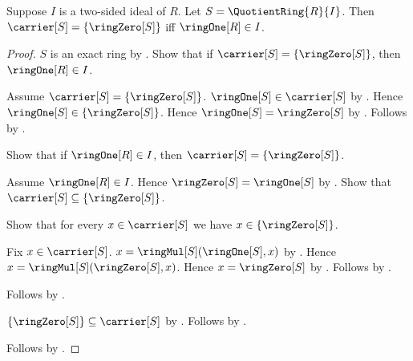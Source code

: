 \begin{theorem}\label{quotient_ring_trivial_iff}
    Suppose $I$ is a two-sided ideal of $R$.
    Let $S=\QuotientRing{R}{I}$.
    Then $\carrier[S]=\{\ringZero[S]\}$ iff $\ringOne[R]\in I$.
\end{theorem}
\begin{proof}
    $S$ is an exact ring by .
    Show that if $\carrier[S]=\{\ringZero[S]\}$, then
        $\ringOne[R]\in I$.
    \begin{subproof}
        Assume $\carrier[S]=\{\ringZero[S]\}$.
        $\ringOne[S]\in\carrier[S]$ by .
        Hence $\ringOne[S]\in\{\ringZero[S]\}$.
        Hence $\ringOne[S]=\ringZero[S]$ by .
        Follows by .
    \end{subproof}
    Show that if $\ringOne[R]\in I$, then
        $\carrier[S]=\{\ringZero[S]\}$.
    \begin{subproof}
        Assume $\ringOne[R]\in I$.
        Hence $\ringZero[S]=\ringOne[S]$ by
            .
        Show that $\carrier[S]\subseteq\{\ringZero[S]\}$.
        \begin{subproof}
            Show that for every $x\in\carrier[S]$ we have
                $x\in\{\ringZero[S]\}$.
            \begin{subproof}
                Fix $x\in\carrier[S]$.
                $x=\ringMul[S](\ringOne[S],x)$ by
                    .
                Hence $x=\ringMul[S](\ringZero[S],x)$.
                Hence $x=\ringZero[S]$ by .
                Follows by .
            \end{subproof}
            Follows by .
        \end{subproof}
        $\{\ringZero[S]\}\subseteq\carrier[S]$ by
            .
        Follows by .
    \end{subproof}
    Follows by \auto.
\end{proof}

